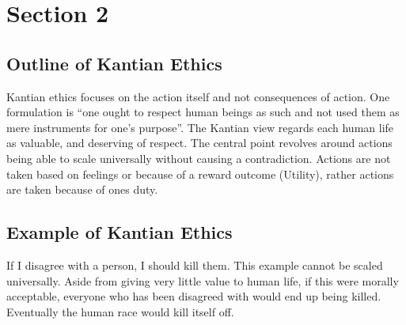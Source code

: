 \section{Section 2}
\subsection{Outline of Kantian Ethics}
Kantian ethics focuses on the action itself and not consequences of action. One formulation is ``one ought to respect human beings as such and not used them as mere instruments for one's purpose''. The Kantian view regards each human life as valuable, and deserving of respect. The central point revolves around actions being able to scale universally without causing a contradiction. Actions are not taken based on feelings or because of a reward outcome (Utility), rather actions are taken because of ones duty.
\subsection{Example of Kantian Ethics}
If I disagree with a person, I should kill them. This example cannot be scaled universally. Aside from giving very little value to human life, if this were morally acceptable, everyone who has been disagreed with would end up being killed. Eventually the human race would kill itself off.